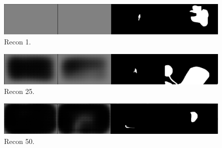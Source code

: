 \documentclass[conference]{IEEEtran}
\begin{document}
\begin{figure}[h!]
\centering
\includegraphics[scale=.18]{recon 1.png}
\caption{Recon 1.}
\label{fig:recons}
\end{figure}
\newline

\begin{figure}[h!]
\centering
\includegraphics[scale=.18]{recon 25.png}
\caption{Recon 25.}
\label{fig:recons}
\end{figure}
\newline

\begin{figure}[h!]
\centering
\includegraphics[scale=.18]{recon 50.png}
\caption{Recon 50.}
\label{fig:recons}
\end{figure}
\newline
\end{document}
